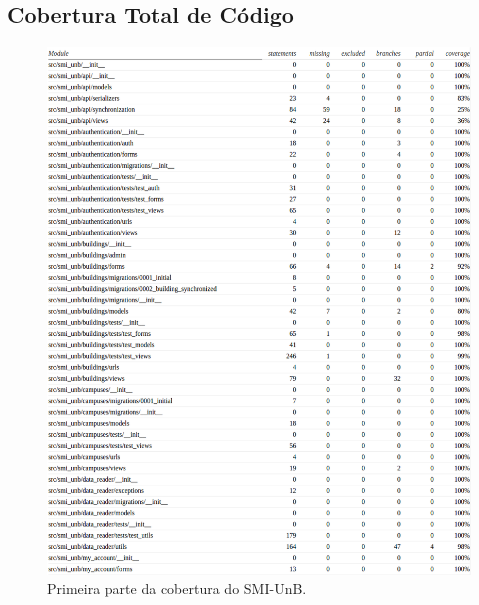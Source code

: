 \begin{anexosenv}
\chapter{Cobertura Total de Código}
\begin{figure}[!htpb]
    \centering
    \includegraphics[keepaspectratio=true,scale=0.45]{figuras/cobertura01.eps}
    \caption{Primeira parte da cobertura do SMI-UnB.}
    \label{cobertura01}
\end{figure}


\end{anexosenv}
